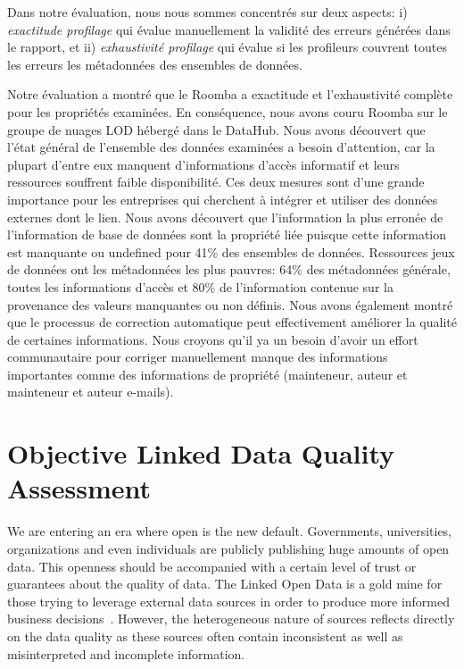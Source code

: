 \documentclass[a4paper,11pt,twoside]{ThesisStyle}
\begin{document}
Dans notre évaluation, nous nous sommes concentrés sur deux aspects: i) \textit{exactitude profilage} qui évalue manuellement la validité des erreurs générées dans le rapport, et ii) \textit{exhaustivité profilage} qui évalue si les profileurs couvrent toutes les erreurs les métadonnées des ensembles de données.

Notre évaluation a montré que le Roomba a exactitude et l'exhaustivité complète pour les propriétés examinées. En conséquence, nous avons couru Roomba sur le groupe de nuages ​​LOD hébergé dans le DataHub. Nous avons découvert que l'état général de l'ensemble des données examinées a besoin d'attention, car la plupart d'entre eux manquent d'informations d'accès informatif et leurs ressources souffrent faible disponibilité. Ces deux mesures sont d'une grande importance pour les entreprises qui cherchent à intégrer et utiliser des données externes dont le lien. Nous avons découvert que l'information la plus erronée de l'information de base de données sont la propriété liée puisque cette information est manquante ou undefined pour 41\% des ensembles de données. Ressources jeux de données ont les métadonnées les plus pauvres: 64\% des métadonnées générale, toutes les informations d'accès et 80\% de l'information contenue sur la provenance des valeurs manquantes ou non définis. Nous avons également montré que le processus de correction automatique peut effectivement améliorer la qualité de certaines informations. Nous croyons qu'il ya un besoin d'avoir un effort communautaire pour corriger manuellement manque des informations importantes comme des informations de propriété (mainteneur, auteur et mainteneur et auteur e-mails).

\section{Objective Linked Data Quality Assessment}\label{chapter:data-quality}

We are entering an era where open is the new default. Governments, universities, organizations and even individuals are publicly publishing huge amounts of open data. This openness should be accompanied with a certain level of trust or guarantees about the quality of data. The Linked Open Data is a gold mine for those trying to leverage external data sources in order to produce more informed business decisions~\cite{Boyd:Article:11}. However, the heterogeneous nature of sources reflects directly on the data quality as these sources often contain inconsistent as well as misinterpreted and incomplete information.
\end{document}
